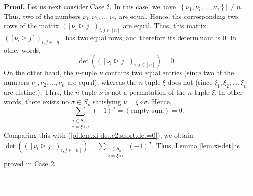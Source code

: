 \documentclass
[numbers=enddot,12pt,final,onecolumn,notitlepage,english]{scrartcl}%
\theoremstyle{definition}
\newenvironment{proof}[1][Proof]{\noindent\textbf{#1.} }{\ \rule{0.5em}{0.5em}}
\let\sumnonlimits\sum
\renewcommand{\sum}{\sumnonlimits\limits}
\newenvironment{vershort}{}{}
\begin{document}
\begin{proof}
\begin{vershort}
Let us next consider Case 2. In this case, we have $\left\vert \left\{
\nu_{1},\nu_{2},\ldots,\nu_{n}\right\}  \right\vert \neq n$. Thus, two of the
numbers $\nu_{1},\nu_{2},\ldots,\nu_{n}$ are equal. Hence, the corresponding
two rows of the matrix $\left(  \left[  \nu_{i}\trianglerighteq j\right]
\right)  _{i,j\in\left[  n\right]  }$ are equal. Thus, this matrix $\left(
\left[  \nu_{i}\trianglerighteq j\right]  \right)  _{i,j\in\left[  n\right]
}$ has two equal rows, and therefore its determinant is $0$. In other words,
\begin{equation}
\det\left(  \left(  \left[  \nu_{i}\trianglerighteq j\right]  \right)
_{i,j\in\left[  n\right]  }\right)  =0. \label{pf.lem.xi-det.c2.short.det=0}%
\end{equation}
On the other hand, the $n$-tuple $\nu$ contains two equal entries (since two
of the numbers $\nu_{1},\nu_{2},\ldots,\nu_{n}$ are equal), whereas the
$n$-tuple $\xi$ does not (since $\xi_{1},\xi_{2},\ldots,\xi_{n}$ are
distinct). Thus, the $n$-tuple $\nu$ is not a permutation of the $n$-tuple
$\xi$. In other words, there exists no $\sigma\in S_{n}$ satisfying $\nu
=\xi\circ\sigma$. Hence,%
\[
\sum_{\substack{\sigma\in S_{n};\\\nu=\xi\circ\sigma}}\left(  -1\right)
^{\sigma}=\left(  \text{empty sum}\right)  =0.
\]
Comparing this with (\ref{pf.lem.xi-det.c2.short.det=0}), we obtain
$\det\left(  \left(  \left[  \nu_{i}\trianglerighteq j\right]  \right)
_{i,j\in\left[  n\right]  }\right)  =\sum_{\substack{\sigma\in S_{n};\\\nu
=\xi\circ\sigma}}\left(  -1\right)  ^{\sigma}$. Thus, Lemma \ref{lem.xi-det}
is proved in Case 2. \medskip
\end{vershort}


\end{proof}
\end{document}
